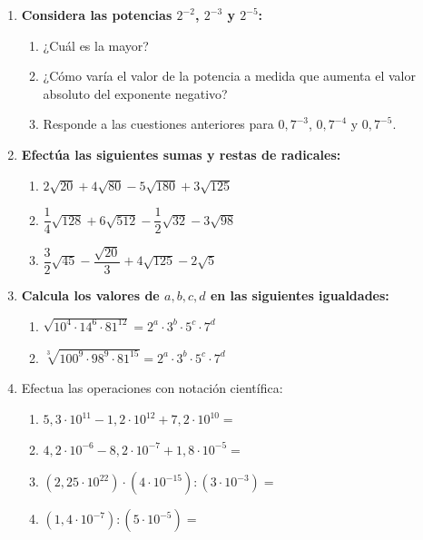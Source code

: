 \documentclass[a4paper,12pt]{article}
\begin{document}
\begin{enumerate}
    \item \textbf{Considera las potencias $2^{-2}$, $2^{-3}$ y $2^{-5}$:}
        \begin{enumerate}[label=\alph*)]
            \item ¿Cuál es la mayor?
            \item ¿Cómo varía el valor de la potencia a medida que aumenta el valor absoluto del exponente negativo?
            \item Responde a las cuestiones anteriores para $0,7^{-3}$, $0,7^{-4}$ y $0,7^{-5}$.
        \end{enumerate}

    \item \textbf{Efectúa las siguientes sumas y restas de radicales:}
        \begin{enumerate}[label=\alph*)]
            \item $2\sqrt{20} + 4\sqrt{80} - 5\sqrt{180} + 3\sqrt{125}$
            \item $\dfrac{1}{4}\sqrt{128} + 6\sqrt{512} - \dfrac{1}{2}\sqrt{32} - 3\sqrt{98}$
            \item $\dfrac{3}{2}\sqrt{45} - \dfrac{\sqrt{20}}{3} + 4\sqrt{125} - 2\sqrt{5}$
        \end{enumerate}

    \item \textbf{Calcula los valores de $a, b, c, d$ en las siguientes igualdades:}
        \begin{enumerate}[label=\alph*)]
            \item $\sqrt{10^{4} \cdot 14^{6} \cdot 81^{12}} = 2^{a} \cdot 3^{b} \cdot 5^{c} \cdot 7^{d}$
            \item $\sqrt[3]{100^{9} \cdot 98^{9} \cdot 81^{15}} = 2^{a} \cdot 3^{b} \cdot 5^{c} \cdot 7^{d}$
        \end{enumerate}

    \item Efectua las operaciones con notación científica:
        \begin{enumerate}
            \item $5,3 \cdot 10^11 - 1,2 \cdot 10^12 + 7,2 \cdot 10^10 = $
            \item $4,2 \cdot 10^{-6} - 8,2 \cdot  10^{-7} + 1,8 \cdot 10^{-5} = $
            \item $(2,25 \cdot 10^22) \cdot (4 \cdot 10^{-15}) : (3 \cdot 10^{-3})=$
            \item $(1,4 \cdot 10^{-7}) : (5 \cdot 10^{-5}) =$ 
        \end{enumerate}

\end{enumerate}
\end{document}
